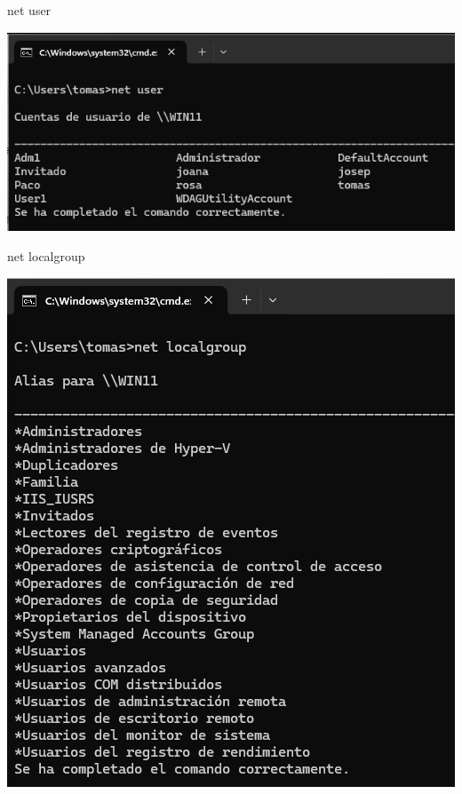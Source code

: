 \documentclass[
  a4paper,
]{article}
\newenvironment{Shaded}{\begin{snugshade}}{\end{snugshade}}
\newcommand{\NormalTok}[1]{#1}
\begin{document}
\begin{Shaded}
\begin{Highlighting}[]
\NormalTok{net user}
\end{Highlighting}
\end{Shaded}

\includegraphics{png/netUser.png}

\begin{Shaded}
\begin{Highlighting}[]
\NormalTok{net localgroup}
\end{Highlighting}
\end{Shaded}

\includegraphics{png/netLocalGroup.png}
\end{document}
